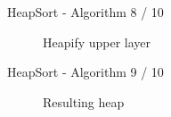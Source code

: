 
\begin{frame}{HeapSort - Algorithm 8 / 10}
  \begin{center}
   \begin{figure}[!h]%
     \begin{columns}%
       \begin{column}{0.425\textwidth}%
         \begin{minipage}{\textwidth}%
           \begin{center}%
            \end{center}%
          \end{minipage}%
        \end{column}%
        \begin{column}{0.425\textwidth}%
          \begin{minipage}{\textwidth}%
            \begin{center}%
            \end{center}%
          \end{minipage}%
        \end{column}%
      \end{columns}%
      \caption{Heapify upper layer}%
      \label{fig:heapify_upper}%
    \end{figure}
  \end{center}
\end{frame}


\begin{frame}{HeapSort - Algorithm 9 / 10}
  \begin{center}
    \begin{figure}[!h]
      \begin{center}%
        \begin{minipage}{0.425\textwidth}%
        \end{minipage}%
      \end{center}%
      \caption{Resulting heap}%
      \label{fig:heapify_upper_final}%
    \end{figure}
  \end{center}
\end{frame}

